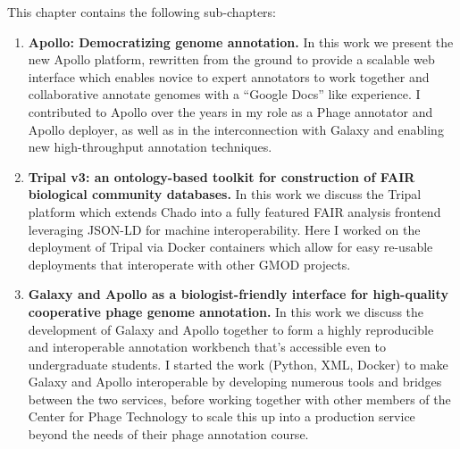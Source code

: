 This chapter contains the following sub-chapters:

\begin{enumerate}[label=\ref{chapter:annotation}.\arabic*]
\itemsep-0.5em
\setcounter{enumi}{-1}
\item \textbf{Apollo: Democratizing genome annotation.} In this work we present the new Apollo platform, rewritten from the ground to provide a scalable web interface which enables novice to expert annotators to work together and collaborative annotate genomes with a ``Google Docs'' like experience. I contributed to Apollo over the years in my role as a Phage annotator and Apollo deployer, as well as in the interconnection with Galaxy and enabling new high-throughput annotation techniques.

\item \textbf{Tripal v3: an ontology-based toolkit for construction of FAIR biological community databases.} In this work we discuss the Tripal platform which extends Chado into a fully featured FAIR analysis frontend leveraging JSON-LD for machine interoperability. Here I worked on the deployment of Tripal via Docker containers which allow for easy re-usable deployments that interoperate with other GMOD projects.


\item \textbf{Galaxy and Apollo as a biologist-friendly interface for high-quality cooperative phage genome annotation.} In this work we discuss the development of Galaxy and Apollo together to form a highly reproducible and interoperable annotation workbench that's accessible even to undergraduate students. I started the work (Python, XML, Docker) to make Galaxy and Apollo interoperable by developing numerous tools and bridges between the two services, before working together with other members of the Center for Phage Technology to scale this up into a production service beyond the needs of their phage annotation course.

\end{enumerate}
